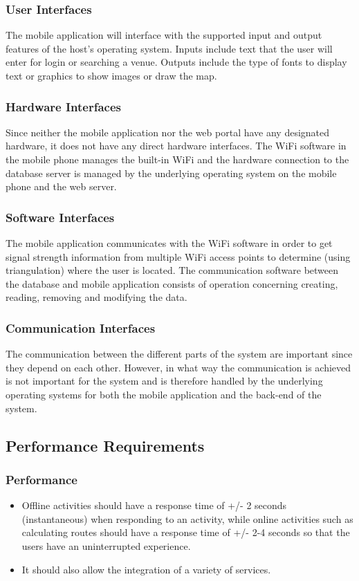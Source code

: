\documentclass{article}
\begin{document}
		\subsubsection{User Interfaces}
		        The mobile application will interface with the supported input and output features of the host's operating system. Inputs include text that the user will enter for login or searching a venue. Outputs include the type of fonts to display text or graphics to show images or draw the map.

		\subsubsection{Hardware Interfaces}
			Since neither the mobile application nor the web portal have any designated hardware, it does not have any direct hardware interfaces. The WiFi software in the mobile phone manages the built-in WiFi and the hardware connection to the database server is managed by the underlying operating system on the mobile phone and the web server.

		\subsubsection{Software Interfaces}
			The mobile application communicates with the WiFi software in order to get signal strength information from multiple WiFi access points to determine (using triangulation) where the user is located. The communication software between the database and mobile application consists of operation concerning creating, reading, removing and modifying the data.

		\subsubsection{Communication Interfaces}
			The communication between the different parts of the system are important since they depend on each other. However, in what way the communication is achieved is not important for the system and is therefore handled by the underlying operating systems for both the mobile application and the back-end of the system.
	
		
	\subsection{Performance Requirements}
		\subsubsection{Performance}
			\begin{itemize}
			\item Offline activities should have a response time of +/- 2 seconds (instantaneous) when responding to an activity, while online activities such as calculating routes should have a response time of +/- 2-4 seconds so that the users have an uninterrupted experience.
			\item It should also allow the integration of a variety of services.\\
			\end{itemize}
\end{document}

